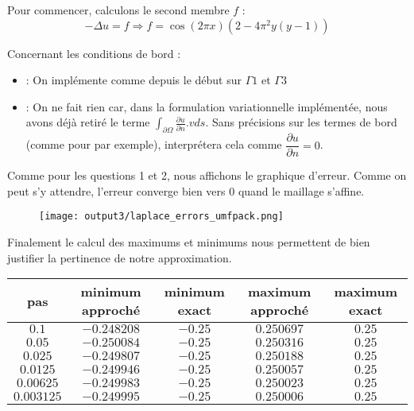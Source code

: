 \documentclass[11pt,a4paper]{report}
\begin{document}
			Pour commencer, calculons le second membre $f$ : 
			\[
			-\Delta u = f \Longrightarrow f = \cos(2\pi x)(2 - 4\pi^2y(y-1))
 			\]
 			
 			Concernant les conditions de bord : 
 			\begin{itemize}
 				\item {} : On implémente comme depuis le début sur $\Gamma 1$ et $\Gamma 3$
 				\item {} : On ne fait rien car, dans la formulation variationnelle implémentée, nous avons déjà retiré le terme $\displaystyle \int_{\partial\Omega} \frac{\partial u }{\partial n}.v ds$. Sans précisions sur les termes de bord (comme pour  par exemple), interprétera cela comme $\dfrac{\partial u}{\partial n} = 0$.
 			\end{itemize}
 		
 			Comme pour les questions 1 et 2, nous affichons le graphique d'erreur. Comme on peut s'y attendre, l'erreur converge bien vers $0$ quand le maillage s'affine. 
 			
			\begin{figure}[H]
			\centering
			\texttt{[image: output3/laplace\_errors\_umfpack.png]}
			\end{figure}
		
			 Finalement le calcul des maximums et minimums nous permettent de bien justifier la pertinence de notre approximation.
			\begin{center}
				\begin{tabular}{|c|c|c|c|c|}
					\hline
					pas & minimum approché & minimum exact & maximum approché & maximum exact \\
					\hline 
					$0.1$ & $-0.248208$ & $-0.25$ & $0.250697$ & $0.25$\\ 
					\hline 
					$0.05$ & $-0.250084$ & $-0.25$ & $0.250316$ & $0.25$\\ 
					\hline 
					$0.025$ & $-0.249807$ & $-0.25$ & $0.250188$ & $0.25$  \\ 
					\hline 
					$0.0125$ & $-0.249946$ & $-0.25$ & $0.250057 $ & $0.25$\\ 
					\hline 
					$0.00625$ & $-0.249983$ & $-0.25$ & $0.250023$ & $0.25$ \\ 
					\hline 
					$0.003125$ & $-0.249995$ & $-0.25$ & $0.250006$ & $0.25$ \\ 
					\hline 
				\end{tabular} 
			\end{center}
		
\end{document}
